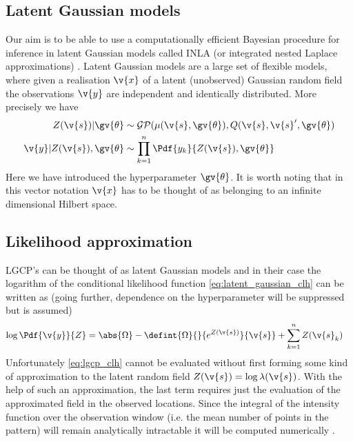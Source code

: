 \documentclass[12pt,a4paper,oneside,article]{memoir}
\begin{document}

\subsection{Latent Gaussian models}

Our aim is to be able to use a computationally efficient Bayesian procedure for inference
in latent Gaussian models called INLA (or integrated nested Laplace approximations) \cite{Rue2009}.
Latent Gaussian models are a large set of flexible models, where given a realisation $\v{x}$ 
of a latent (unobserved) Gaussian random field the observations $\v{y}$ are independent and identically
distributed. 
More precisely we have
\begin{align}
	Z(\v{s})|\gv{\theta}&\sim \mathcal{GP}(\mu(\v{s},\gv{\theta}),Q(\v{s},\v{s}',\gv{\theta})\\
	\v{y}|Z(\v{s}),\gv{\theta}&\sim \prod_{k=1}^n \Pdf{y_k}{Z(\v{s}),\gv{\theta}} \label{eq:latent_gaussian_clh}
\end{align} 
Here we have introduced the hyperparameter $\gv{\theta}$. It is worth noting that
in this vector notation $\v{x}$ has to be thought of as belonging to an infinite
dimensional Hilbert space. 

\subsection{Likelihood approximation}

LGCP's can be thought of as latent Gaussian models and in their case the logarithm of the 
conditional likelihood function
\eqref{eq:latent_gaussian_clh} can be written as \cite{Moller2007,Gelfand2010,Simpson2011} (going further, dependence on the hyperparameter
will be suppressed but is assumed)
\begin{align}
	\log\Pdf{\v{y}}{Z}&= \abs{\Omega}-\defint{\Omega}{}{e^{Z(\v{s})}}{\v{s}}+\sum_{k=1}^n Z(\v{s}_k)
	\label{eq:lgcp_clh}
\end{align} 
Unfortunately \eqref{eq:lgcp_clh} cannot be evaluated without first forming some kind of
approximation to the latent random field $Z(\v{s})=\log \lambda(\v{s})$. With the help of such an approximation, the last term requires
just the evaluation of the approximated field in the observed locations. Since the integral of the intensity
function over the observation window (i.e. the mean number of points in the pattern) will remain 
analytically intractable it will be computed numerically \cite{Simpson2011}.
\end{document}
